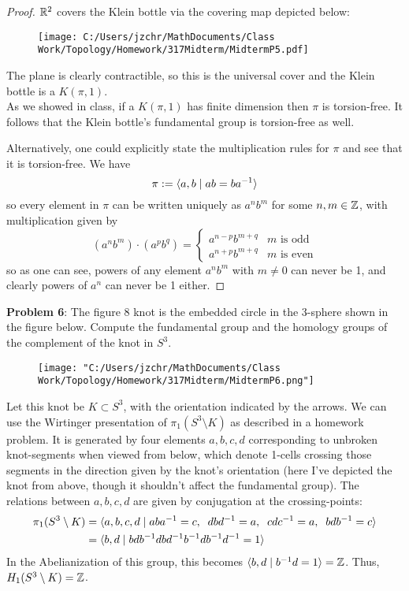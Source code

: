 \documentclass{amsart}
\begin{document}
	 \begin{proof}
	 	$\mathbb{R}^2$ covers the Klein bottle via the covering map depicted below:
	 	
	 	\begin{figure}[h]
	 		\texttt{[image: C:/Users/jzchr/MathDocuments/Class Work/Topology/Homework/317Midterm/MidtermP5.pdf]}
	 	\end{figure}
	 	
	 	The plane is clearly contractible, so this is the universal cover and the Klein bottle is a $K(\pi,1)$.\\
	 	
	 	As we showed in class, if a $K(\pi,1)$ has finite dimension then $\pi$ is torsion-free. It follows that the Klein bottle's fundamental group is torsion-free as well.
	 	
	 	Alternatively, one could explicitly state the multiplication rules for $\pi$ and see that it is torsion-free. We have
	 	$$
	 	\pi := \langle a,b\; | \; ab=ba^{-1}\rangle
	 	$$
	 	so every element in $\pi$ can be written uniquely as $a^nb^m$ for some $n,m\in \mathbb{Z}$, with multiplication given by 
	 	$$
	 	(a^nb^m)\cdot (a^pb^q) = \begin{cases}
	 		a^{n-p}b^{m+q} & m \text{ is odd}\\
	 		a^{n+p}b^{m+q} & m \text{ is even}
	 	\end{cases}
	 	$$
	 	so as one can see, powers of any element $a^nb^m$ with $m\neq 0$ can never be 1, and clearly powers of $a^n$ can never be 1 either.
	 \end{proof}
	 
	 \newpage 
	 \textbf{Problem 6}: The figure 8 knot is the embedded circle in the 3-sphere shown in the figure below. Compute the fundamental group and the homology groups of the complement of the knot in $S^3$.
	 \begin{figure}[h]
	 	\texttt{[image: "C:/Users/jzchr/MathDocuments/Class Work/Topology/Homework/317Midterm/MidtermP6.png"]}
	 \end{figure}
	 
	 Let this knot be $K\subset S^3$, with the orientation indicated by the arrows. We can use the Wirtinger presentation of $\pi_1(S^3\setminus K)$ as described in a homework problem. It is generated by four elements $a,b,c,d$ corresponding to unbroken knot-segments when viewed from below, which denote 1-cells crossing those segments in the direction given by the knot's orientation (here I've depicted the knot from above, though it shouldn't affect the fundamental group). The relations between $a,b,c,d$ are given by conjugation at the crossing-points:
	 \begin{align*}
	 \pi_1(S^3\setminus K) &= \langle a,b,c,d \; | \; aba^{-1}=c, \;\; dbd^{-1} = a, \;\; cdc^{-1} = a, \;\; bdb^{-1} = c\rangle\\
	 &= \langle b,d \; | \; bdb^{-1}dbd^{-1}b^{-1}db^{-1}d^{-1} = 1\rangle
	 \end{align*}
	 In the Abelianization of this group, this becomes $\langle b,d \; | \; b^{-1}d=1\rangle=\mathbb{Z}$. Thus, $H_1(S^3\setminus K)=\mathbb{Z}$.\\
	 
\end{document}
